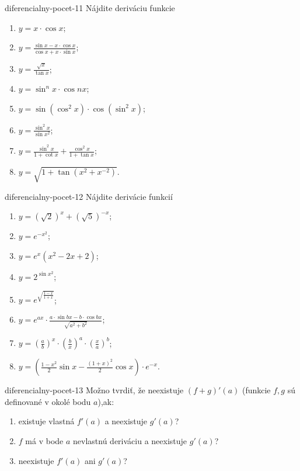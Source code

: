 \begin{defproblem}{diferencialny-pocet-11}
Nájdite deriváciu funkcie
\begin{multicols}{2}
\begin{enumerate}
    \item $y=x\cdot\cos x$;
    \item $y=\frac{\sin x-x\cdot\cos x}{\cos x+x\cdot\sin x}$;
    \item $y=\frac{\sqrt{x}}{\tan x}$;
    \item $y=\sin^n x\cdot\cos nx$;
    \item $y=\sin (\cos^2 x)\cdot \cos (\sin^2 x)$;
    \item $y=\frac{\sin^2 x}{\sin x^2}$;
    \item $y=\frac{\sin^2 x}{1+\cot x}+\frac{\cos^2 x}{1+\tan x}$;
    \item $y=\sqrt{1+\tan (x^2+x^{-2})}$.
\end{enumerate}
\end{multicols}
\end{defproblem}

\begin{defproblem}{diferencialny-pocet-12}
Nájdite derivácie funkcií
\begin{multicols}{2}
\begin{enumerate}
    \item $y=(\sqrt{2})^x+(\sqrt{5})^{-x}$;
    \item $y=e^{-x^2}$;
    \item $y=e^x(x^2-2x+2)$;
    \item $y=2^{\sin x^2}$;
    \item $y=e^{\sqrt{\frac{1-x}{1+x}}}$;
    \item $y=e^{ax}\cdot\frac{a\cdot\sin bx - b\cdot\cos bx}{\sqrt{a^2+b^2}}$;
    \item $y=(\frac{a}{b})^x\cdot(\frac{b}{x})^a\cdot(\frac{x}{a})^b$;
    \item $y=(\frac{1-x^2}{2}\sin x -\frac{(1+x)^2}{2}\cos x)\cdot e^{-x}$.
\end{enumerate}
\end{multicols}
\end{defproblem}

\begin{defproblem}{diferencialny-pocet-13}
Možno tvrdiť, že neexistuje $(f+g)'(a)$ (funkcie $f,g$ sú definované v okolé bodu $a$),ak:
\begin{enumerate}
\item existuje vlastná $f'(a)$ a neexistuje $g'(a)$?
\item $f$ má v bode $a$ nevlastnú deriváciu a neexistuje $g'(a)$?
\item neexistuje $f'(a)$ ani $g'(a)$?
\end{enumerate}
\end{defproblem}

